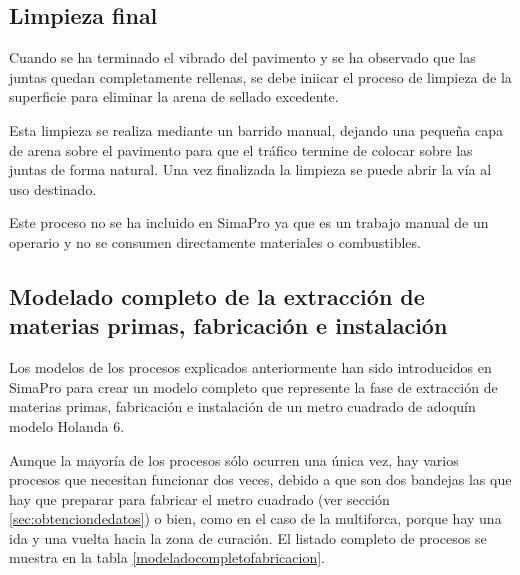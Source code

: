 \subsection{Limpieza final}

Cuando se ha terminado el vibrado del pavimento y se ha observado que las juntas quedan completamente rellenas, se debe iniicar el proceso de limpieza de la superficie para eliminar la arena de sellado excedente.

Esta limpieza se realiza mediante un barrido manual, dejando una pequeña capa de arena sobre el pavimento para que el tráfico termine de colocar sobre las juntas de forma natural. Una vez finalizada la limpieza se puede abrir la vía al uso destinado.

Este proceso no se ha incluido en SimaPro ya que es un trabajo manual de un operario y no se consumen directamente materiales o combustibles.

\subsection{Modelado completo de la extracción de materias primas, fabricación e instalación}\label{sec:modeladofabricacion}

Los modelos de los procesos explicados anteriormente han sido introducidos en SimaPro para crear un modelo completo que represente la fase de extracción de materias primas, fabricación e instalación de un metro cuadrado de adoquín modelo Holanda 6.

Aunque la mayoría de los procesos sólo ocurren una única vez, hay varios procesos que necesitan funcionar dos veces, debido a que son dos bandejas las que hay que preparar para fabricar el metro cuadrado (ver sección \ref{sec:obtenciondedatos}) o bien, como en el caso de la multiforca, porque hay una ida y una vuelta hacia la zona de curación. El listado completo de procesos se muestra en la tabla \ref{modeladocompletofabricacion}.

